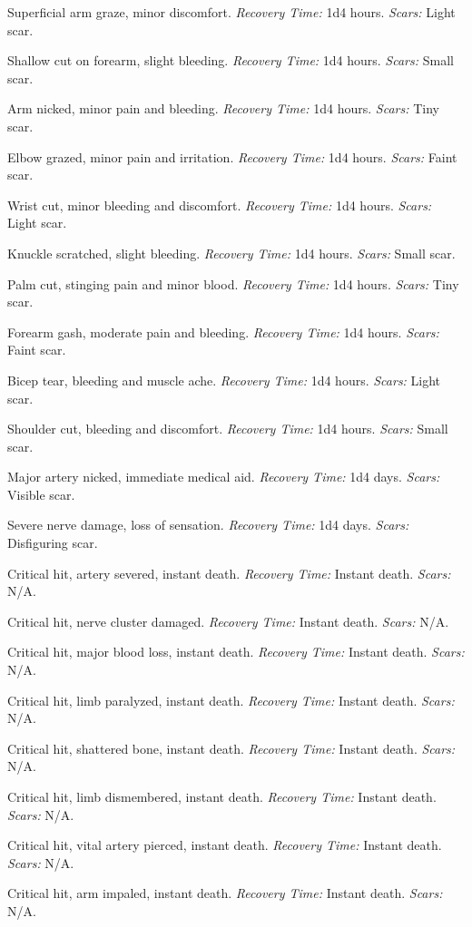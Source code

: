 \documentclass[12pt]{book}  %
\begin{document}
\begin{description}[labelwidth=1.5em, leftmargin=*, itemsep=0.4em]
    \item[1 -] Superficial arm graze, minor discomfort. \textit{Recovery Time:} 1d4 hours. \textit{Scars:} Light scar.
    \item[2 -] Shallow cut on forearm, slight bleeding. \textit{Recovery Time:} 1d4 hours. \textit{Scars:} Small scar.
    \item[3 -] Arm nicked, minor pain and bleeding. \textit{Recovery Time:} 1d4 hours. \textit{Scars:} Tiny scar.
    \item[4 -] Elbow grazed, minor pain and irritation. \textit{Recovery Time:} 1d4 hours. \textit{Scars:} Faint scar.
    \item[5 -] Wrist cut, minor bleeding and discomfort. \textit{Recovery Time:} 1d4 hours. \textit{Scars:} Light scar.
    \item[6 -] Knuckle scratched, slight bleeding. \textit{Recovery Time:} 1d4 hours. \textit{Scars:} Small scar.
    \item[7 -] Palm cut, stinging pain and minor blood. \textit{Recovery Time:} 1d4 hours. \textit{Scars:} Tiny scar.
    \item[8 -] Forearm gash, moderate pain and bleeding. \textit{Recovery Time:} 1d4 hours. \textit{Scars:} Faint scar.
    \item[9 -] Bicep tear, bleeding and muscle ache. \textit{Recovery Time:} 1d4 hours. \textit{Scars:} Light scar.
    \item[10 -] Shoulder cut, bleeding and discomfort. \textit{Recovery Time:} 1d4 hours. \textit{Scars:} Small scar.
    \item[11 -] Major artery nicked, immediate medical aid. \textit{Recovery Time:} 1d4 days. \textit{Scars:} Visible scar.
    \item[12 -] Severe nerve damage, loss of sensation. \textit{Recovery Time:} 1d4 days. \textit{Scars:} Disfiguring scar.
    \item[13 -] Critical hit, artery severed, instant death. \textit{Recovery Time:} Instant death. \textit{Scars:} N/A.
    \item[14 -] Critical hit, nerve cluster damaged. \textit{Recovery Time:} Instant death. \textit{Scars:} N/A.
    \item[15 -] Critical hit, major blood loss, instant death. \textit{Recovery Time:} Instant death. \textit{Scars:} N/A.
    \item[16 -] Critical hit, limb paralyzed, instant death. \textit{Recovery Time:} Instant death. \textit{Scars:} N/A.
    \item[17 -] Critical hit, shattered bone, instant death. \textit{Recovery Time:} Instant death. \textit{Scars:} N/A.
    \item[18 -] Critical hit, limb dismembered, instant death. \textit{Recovery Time:} Instant death. \textit{Scars:} N/A.
    \item[19 -] Critical hit, vital artery pierced, instant death. \textit{Recovery Time:} Instant death. \textit{Scars:} N/A.
    \item[20 -] Critical hit, arm impaled, instant death. \textit{Recovery Time:} Instant death. \textit{Scars:} N/A.
\end{description}
\end{document}

